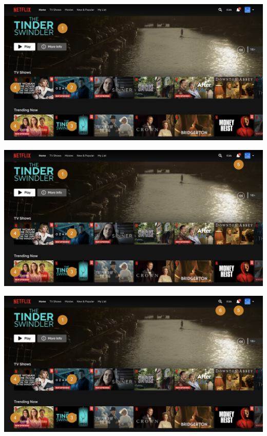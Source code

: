 \documentclass[11pt,aspectratio=169]{beamer}
\begin{document}
\begin{frame}{}

\begin{center}
\includegraphics[scale=0.25]{images/netflix-4.png}
\end{center}

\end{frame}

\begin{frame}{}

\begin{center}
\includegraphics[scale=0.25]{images/netflix-5.png}
\end{center}

\end{frame}

\begin{frame}{}

\begin{center}
\includegraphics[scale=0.25]{images/netflix-6.png}
\end{center}

\end{frame}
\end{document}
